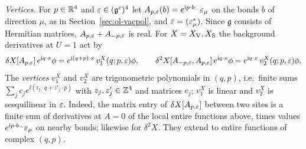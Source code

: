 \emph{Vertices.} For $p\in\mathbb R^4$ and $\varepsilon\in(\mathfrak g^c)^4$ let $A_{p,\varepsilon}(b)=e^{\mathrm i p\cdot b_-}\varepsilon_\mu$ on the bonds $b$ of direction $\mu$, as in Section~\ref{sec:ol-vacpol}, and $\bar{\varepsilon}=(\varepsilon_\mu^*)$. Since $\mathfrak g$ consists of Hermitian matrices, $A_{p,\varepsilon}+A_{-p,\bar{\varepsilon}}$ is real. For $X=X_{\rm V},X_{\rm S}$ the background derivatives at $U=1$ act by
\[
\delta X[A_{p,\varepsilon}]\,e^{\mathrm i q\cdot x}\phi=e^{\mathrm i(q+p)\cdot x}\,v_1^X(q;p,\varepsilon)\phi,\qquad\delta^2X[A_{-p,\bar{\varepsilon}},A_{p,\varepsilon}]\,e^{\mathrm i q\cdot x}\phi=e^{\mathrm i q\cdot x}\,v_2^X(q;p,\varepsilon)\phi .
\]
The \emph{vertices} $v_1^X$ and $v_2^X$ are trigonometric polynomials in $(q,p)$, i.e.\ finite sums $\sum_jc_je^{\ii(z_j\cdot q+z'_j\cdot p)}$ with $z_j,z'_j\in\mathbb Z^4$ and matrices $c_j$; $v_1^X$ is linear and $v_2^X$ is sesquilinear in $\varepsilon$. Indeed, the matrix entry of $\delta X[A_{p,\varepsilon}]$ between two sites is a finite sum of derivatives at $A=0$ of the local entire functions above, times values $e^{\mathrm i p\cdot b_-}\varepsilon_\mu$ on nearby bonds; likewise for $\delta^2X$. They extend to entire functions of complex $(q,p)$.

